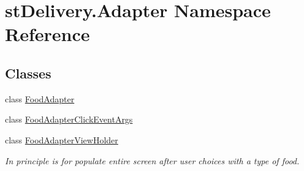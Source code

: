 \hypertarget{namespacest_delivery_1_1_adapter}{}\section{st\+Delivery.\+Adapter Namespace Reference}
\label{namespacest_delivery_1_1_adapter}
\subsection*{Classes}
\begin{DoxyCompactItemize}
\item 
class \hyperlink{classst_delivery_1_1_adapter_1_1_food_adapter}{Food\+Adapter}
\item 
class \hyperlink{classst_delivery_1_1_adapter_1_1_food_adapter_click_event_args}{Food\+Adapter\+Click\+Event\+Args}
\item 
class \hyperlink{classst_delivery_1_1_adapter_1_1_food_adapter_view_holder}{Food\+Adapter\+View\+Holder}
\begin{DoxyCompactList}\small\item\em In principle is for populate entire screen after user choices with a type of food. \end{DoxyCompactList}\end{DoxyCompactItemize}
